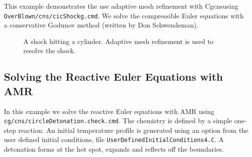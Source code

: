 \documentclass{article}
\newcommand{\Solver}{Cgcns}
\begin{document}
This example demonstrates the use adaptive mesh refinement with \Solver using {\tt OverBlown/cns/cicShockg.cmd}.
We solve the compressible Euler equations with a conservative Godunov method (written by Don Schwendeman).


{
\newcommand{\figWidth}{7.27cm}
\newcommand{\trimfig}[2]{\trimPlot{#1}{#2}{.0}{.0}{.0}{.0}}
\newcommand{\figWidtha}{8cm}
\newcommand{\trimfiga}[2]{\trimPlot{#1}{#2}{.0}{.0}{.1}{.0}}
\begin{figure}[hbt]
\begin{center}
\end{center}
 \caption{A shock hitting a cylinder. Adaptive mesh refinement is used to resolve the shock.}
\end{figure}
}



\clearpage
\subsection{Solving the Reactive Euler Equations with AMR}

In this example we solve the reactive Euler equations with AMR using
{\tt cg/cns/circleDetonation.check.cmd}. The chemistry is defined by a simple one-step
reaction. An initial temperature profile
is generated using an option from the user defined initial conditions, file {\tt UserDefinedInitialConditions4.C}.
A detonation forms at the hot spot, expands and reflects off the boundaries.
\end{document}
